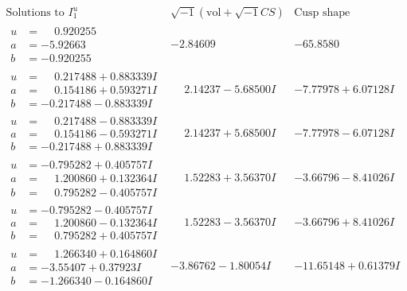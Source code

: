 \documentclass[1p]{elsarticle_modified}
\theoremstyle{definition}
\newcommand{\I}{\sqrt{-1}}
\begin{document}
$$\begin{array}{c|c|c}  
\text{Solutions to }I^u_{1}& \I (\text{vol} + \sqrt{-1}CS) & \text{Cusp shape}\\
 \hline 
\begin{aligned}
u &= \phantom{-}0.920255\phantom{ +0.000000I} \\
a &= -5.92663\phantom{ +0.000000I} \\
b &= -0.920255\phantom{ +0.000000I}\end{aligned}
 & -2.84609\phantom{ +0.000000I} & -65.8580\phantom{ +0.000000I} \\ \hline\begin{aligned}
u &= \phantom{-}0.217488 + 0.883339 I \\
a &= \phantom{-}0.154186 + 0.593271 I \\
b &= -0.217488 - 0.883339 I\end{aligned}
 & \phantom{-}2.14237 - 5.68500 I & -7.77978 + 6.07128 I \\ \hline\begin{aligned}
u &= \phantom{-}0.217488 - 0.883339 I \\
a &= \phantom{-}0.154186 - 0.593271 I \\
b &= -0.217488 + 0.883339 I\end{aligned}
 & \phantom{-}2.14237 + 5.68500 I & -7.77978 - 6.07128 I \\ \hline\begin{aligned}
u &= -0.795282 + 0.405757 I \\
a &= \phantom{-}1.200860 + 0.132364 I \\
b &= \phantom{-}0.795282 - 0.405757 I\end{aligned}
 & \phantom{-}1.52283 + 3.56370 I & -3.66796 - 8.41026 I \\ \hline\begin{aligned}
u &= -0.795282 - 0.405757 I \\
a &= \phantom{-}1.200860 - 0.132364 I \\
b &= \phantom{-}0.795282 + 0.405757 I\end{aligned}
 & \phantom{-}1.52283 - 3.56370 I & -3.66796 + 8.41026 I \\ \hline\begin{aligned}
u &= \phantom{-}1.266340 + 0.164860 I \\
a &= -3.55407 + 0.37923 I \\
b &= -1.266340 - 0.164860 I\end{aligned}
 & -3.86762 - 1.80054 I & -11.65148 + 0.61379 I \\ \hline\begin{aligned}

\end{aligned}
\end{array}$$
\end{document}
